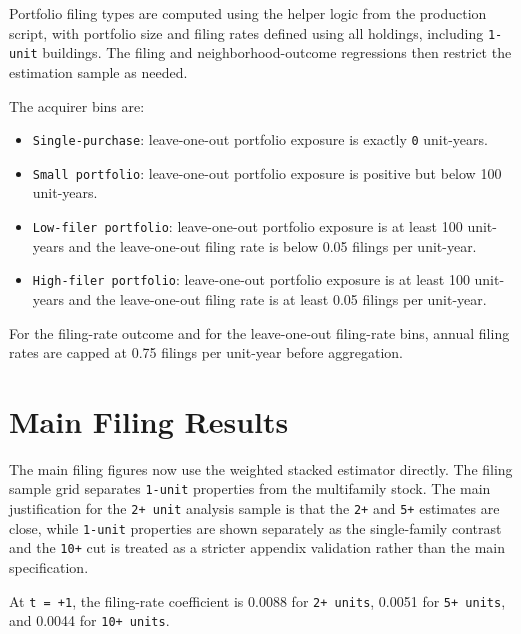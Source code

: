 \documentclass[
  11pt,
]{article}
\providecommand{\tightlist}{%
  \setlength{\itemsep}{0pt}\setlength{\parskip}{0pt}}
\begin{document}
Portfolio filing types are computed using the helper logic from the
production script, with portfolio size and filing rates defined using
all holdings, including \texttt{1-unit} buildings. The filing and
neighborhood-outcome regressions then restrict the estimation sample as
needed.

The acquirer bins are:

\begin{itemize}
\tightlist
\item
  \texttt{Single-purchase}: leave-one-out portfolio exposure is exactly
  \texttt{0} unit-years.
\item
  \texttt{Small\ portfolio}: leave-one-out portfolio exposure is
  positive but below 100 unit-years.
\item
  \texttt{Low-filer\ portfolio}: leave-one-out portfolio exposure is at
  least 100 unit-years and the leave-one-out filing rate is below 0.05
  filings per unit-year.
\item
  \texttt{High-filer\ portfolio}: leave-one-out portfolio exposure is at
  least 100 unit-years and the leave-one-out filing rate is at least
  0.05 filings per unit-year.
\end{itemize}

For the filing-rate outcome and for the leave-one-out filing-rate bins,
annual filing rates are capped at 0.75 filings per unit-year before
aggregation.

\section{Main Filing Results}\label{main-filing-results}

The main filing figures now use the weighted stacked estimator directly.
The filing sample grid separates \texttt{1-unit} properties from the
multifamily stock. The main justification for the \texttt{2+\ unit}
analysis sample is that the \texttt{2+} and \texttt{5+} estimates are
close, while \texttt{1-unit} properties are shown separately as the
single-family contrast and the \texttt{10+} cut is treated as a stricter
appendix validation rather than the main specification.

At \texttt{t\ =\ +1}, the filing-rate coefficient is 0.0088 for
\texttt{2+\ units}, 0.0051 for \texttt{5+\ units}, and 0.0044 for
\texttt{10+\ units}.
\end{document}
